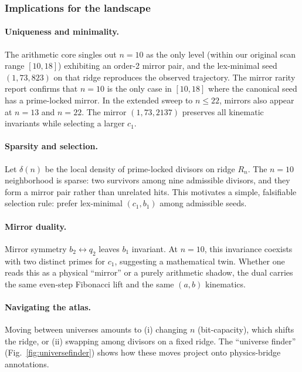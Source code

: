 \documentclass[12pt]{article}
\numberwithin{equation}{section}
\begin{document}
\subsubsection{Implications for the landscape}\label{subsec:implications-landscape}
\paragraph{Uniqueness and minimality.} The arithmetic core singles out $n=10$ as the only level (within our original scan range $[10,18]$) exhibiting an order-2 mirror pair, and the lex-minimal seed $(1,73,823)$ on that ridge reproduces the observed trajectory. The mirror rarity report confirms that $n=10$ is the only case in $[10,18]$ where the canonical seed has a prime-locked mirror. In the extended sweep to $n \le 22$, mirrors also appear at $n=13$ and $n=22$. The mirror $(1,73,2137)$ preserves all kinematic invariants while selecting a larger $c_1$.

\paragraph{Sparsity and selection.} Let $\delta(n)$ be the local density of prime-locked divisors on ridge $R_n$. The $n=10$ neighborhood is sparse: two survivors among nine admissible divisors, and they form a mirror pair rather than unrelated hits. This motivates a simple, falsifiable selection rule: prefer lex-minimal $(c_1,b_1)$ among admissible seeds.

\paragraph{Mirror duality.} Mirror symmetry $b_2\leftrightarrow q_2$ leaves $b_1$ invariant. At $n=10$, this invariance coexists with two distinct primes for $c_1$, suggesting a mathematical twin. Whether one reads this as a physical ``mirror'' or a purely arithmetic shadow, the dual carries the same even-step Fibonacci lift and the same $(a,b)$ kinematics.

\paragraph{Navigating the atlas.} Moving between universes amounts to (i) changing $n$ (bit-capacity), which shifts the ridge, or (ii) swapping among divisors on a fixed ridge. The ``universe finder'' (Fig.~\ref{fig:universefinder}) shows how these moves project onto physics-bridge annotations.
\end{document}
